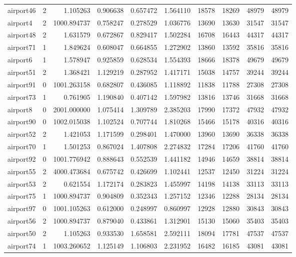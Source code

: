 \begin{longtable}{|l|r|r|r|r|r|r|r|r|r|}
airport46 & 2 & 1.105263 & 0.906638 & 0.657472 & 1.564110 & 18578 & 18269 & 48979 & 48979 \\
airport4 & 2 & 1000.894737 & 0.758247 & 0.278529 & 1.036776 & 13690 & 13630 & 31547 & 31547 \\
airport48 & 2 & 1.631579 & 0.672867 & 0.829417 & 1.502284 & 16708 & 16443 & 44317 & 44317 \\
airport71 & 1 & 1.849624 & 0.608047 & 0.664855 & 1.272902 & 13860 & 13592 & 35816 & 35816 \\
airport6 & 1 & 1.578947 & 0.925859 & 0.628534 & 1.554393 & 18666 & 18378 & 49679 & 49679 \\
airport51 & 2 & 1.368421 & 1.129219 & 0.287952 & 1.417171 & 15038 & 14757 & 39244 & 39244 \\
airport91 & 0 & 1001.263158 & 0.682807 & 0.436085 & 1.118892 & 11838 & 11788 & 27308 & 27308 \\
airport73 & 1 & 0.761905 & 1.190840 & 0.407142 & 1.597982 & 13816 & 13746 & 31668 & 31668 \\
airport8 & 0 & 2001.000000 & 1.075414 & 1.309789 & 2.385203 & 17990 & 17372 & 47932 & 47932 \\
airport90 & 0 & 1002.015038 & 1.102524 & 0.707744 & 1.810268 & 15466 & 15178 & 40316 & 40316 \\
airport52 & 2 & 1.421053 & 1.171599 & 0.298401 & 1.470000 & 13960 & 13690 & 36338 & 36338 \\
airport70 & 1 & 1.501253 & 0.867024 & 1.407808 & 2.274832 & 17284 & 17206 & 41760 & 41760 \\
airport92 & 0 & 1001.776942 & 0.888643 & 0.552539 & 1.441182 & 14946 & 14659 & 38814 & 38814 \\
airport55 & 2 & 4000.473684 & 0.675742 & 0.426699 & 1.102441 & 12537 & 12450 & 31224 & 31224 \\
airport53 & 2 & 0.621554 & 1.172174 & 0.283823 & 1.455997 & 14198 & 14138 & 33113 & 33113 \\
airport75 & 1 & 1000.894737 & 0.904809 & 0.352343 & 1.257152 & 12346 & 12288 & 28134 & 28134 \\
airport97 & 0 & 1001.105263 & 0.612000 & 0.248997 & 0.860997 & 12928 & 12880 & 30843 & 30843 \\
airport56 & 2 & 1000.894737 & 0.879040 & 0.433861 & 1.312901 & 15130 & 15060 & 35403 & 35403 \\
airport50 & 2 & 1.105263 & 0.933530 & 1.658581 & 2.592111 & 18094 & 17781 & 47537 & 47537 \\
airport74 & 1 & 1003.260652 & 1.125149 & 1.106803 & 2.231952 & 16482 & 16185 & 43081 & 43081 \\

\end{longtable}
